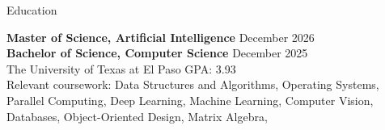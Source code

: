 \documentclass{resume} %
\begin{document}
\introduction[
    fullname=Ashkan Arabi,
    phone=(915) 888 - 9801,
    email=aarabimian@miners.utep.edu,
    linkedin=/in/ashkan-arabi,
    github=github.com/AshkanArabim,
]


\begin{workSection}{Education}

	\textbf{Master of Science, Artificial Intelligence} \hfill {December 2026} \\
	\textbf{Bachelor of Science, Computer Science} \hfill {December 2025} \\
	The University of Texas at El Paso \hfill GPA: 3.93 \\
	Relevant coursework: 
		Data Structures and Algorithms{,} %
		Operating Systems{,}
		Parallel Computing{,} 
		Deep Learning{,} 
		Machine Learning{,} 
		Computer Vision{,} 
		Databases{,}
		Object-Oriented Design{,} 
		Matrix Algebra{,}
\end{workSection}
\end{document}
